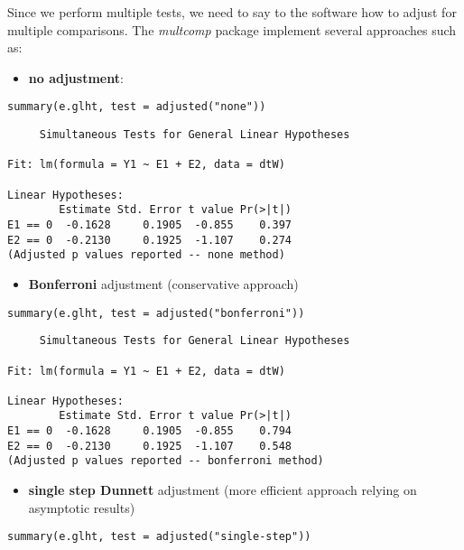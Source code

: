 \documentclass{article}
\begin{document}
Since we perform multiple tests, we need to say to the software how to
adjust for multiple comparisons. The \emph{multcomp} package implement several approaches such as:
\begin{itemize}
\item \textbf{no adjustment}:
\end{itemize}
\lstset{language=r,label= ,caption= ,captionpos=b,numbers=none}
\begin{lstlisting}
summary(e.glht, test = adjusted("none"))
\end{lstlisting}

\begin{verbatim}
	 Simultaneous Tests for General Linear Hypotheses

Fit: lm(formula = Y1 ~ E1 + E2, data = dtW)

Linear Hypotheses:
        Estimate Std. Error t value Pr(>|t|)
E1 == 0  -0.1628     0.1905  -0.855    0.397
E2 == 0  -0.2130     0.1925  -1.107    0.274
(Adjusted p values reported -- none method)
\end{verbatim}

\begin{itemize}
\item \textbf{Bonferroni} adjustment (conservative approach)
\end{itemize}
\lstset{language=r,label= ,caption= ,captionpos=b,numbers=none}
\begin{lstlisting}
summary(e.glht, test = adjusted("bonferroni"))
\end{lstlisting}

\begin{verbatim}
	 Simultaneous Tests for General Linear Hypotheses

Fit: lm(formula = Y1 ~ E1 + E2, data = dtW)

Linear Hypotheses:
        Estimate Std. Error t value Pr(>|t|)
E1 == 0  -0.1628     0.1905  -0.855    0.794
E2 == 0  -0.2130     0.1925  -1.107    0.548
(Adjusted p values reported -- bonferroni method)
\end{verbatim}

\begin{itemize}
\item \textbf{single step Dunnett} adjustment (more efficient approach relying on
asymptotic results)
\end{itemize}
\lstset{language=r,label= ,caption= ,captionpos=b,numbers=none}
\begin{lstlisting}
summary(e.glht, test = adjusted("single-step"))
\end{lstlisting}
\end{document}
